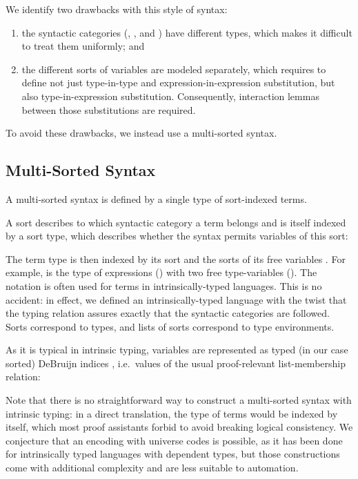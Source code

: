 \documentclass[sigplan,10pt, anonymous]{acmart}
\newenvironment{LibCode*}{%
  \begin{tcolorbox}[%
    colframe=white,%
    boxrule=0.0pt,%
    top=2.5pt,%
    left=2.5pt,%
    bottom=2.5pt,%
    right=2.5pt,%
    boxsep=0pt%
  ]\vspace{-0.2\baselineskip}%
}{%
  \vspace{-1\baselineskip}%
  \end{tcolorbox}%
}
\newcommand*\LibCode[1]{\begin{LibCode*}{#1}\end{LibCode*}}
\newcommand*\AppCode[1]{{#1}}
\newcommand*\ACode[1]{\AgdaFontStyle{\textcolor{mygray}{#1}}}
\newcommand*\ACon[1]{\AgdaInductiveConstructor{#1}}
\begin{document}
  We identify two drawbacks with this style of syntax:
  \begin{enumerate}
  \item
    the syntactic categories (\ACode{\ACon{Kind}},
    \ACode{\ACon{Type}}, and \ACode{\ACon{Expr}})
    have different types, which makes it difficult to treat them uniformly; and
  \item the different sorts of variables are modeled separately, which requires to define not just
    type-in-type and expression-in-expression substitution, but also type-in-expression substitution.
    Consequently, interaction lemmas between those substitutions are required.
  \end{enumerate}
  To avoid these drawbacks, we instead use a multi-sorted syntax.

  \subsection{Multi-Sorted Syntax}
  \label{sec:syntax:multi}
  A multi-sorted syntax is defined by a single type of sort-indexed terms.

  A sort describes to which syntactic category a term belongs and is
  itself indexed by a sort type, which describes whether the syntax
  permits variables of this sort:
  \LibCode\KSortTy
  \AppCode\FSort
  
  The term type \ACode{S \ACon{⊢} s} is then indexed by its sort
  \ACode{s} and the sorts of its free variables \ACode{S}.
  For example, \ACode{\ACon{[𝕥, 𝕥] ⊢ 𝕖}} is the type of expressions
  (\ACode{\ACon{𝕖}}) with two free type-variables (\ACode{\ACon{𝕥}}).
  \AppCode\FSyntax
  The notation \ACode{\ACon{\_⊢\_}} is often used for terms in
  intrinsically-typed languages. This is no accident: in effect, we
  defined an intrinsically-typed language with the twist that the
  typing relation assures exactly that the syntactic categories are followed.
  Sorts \ACode{s} correspond to types, and lists of sorts \ACode{S}
  correspond to type environments.

  As it is typical in intrinsic typing, variables are represented as
  typed (in our case sorted) DeBruijn indices \ACode{S \ACon{∋} s}, i.e.\
  values of the usual proof-relevant list-membership relation:
  \LibCode\KVariables

  Note that there is no straightforward way to construct a
  multi-sorted syntax with intrinsic typing: in a direct translation,
  the type of terms \ACode{\ACon{\_⊢\_}} would be indexed by itself, which
  most proof assistants forbid to avoid breaking logical consistency.
  We conjecture that an encoding with universe codes is possible, as
  it has been done for intrinsically typed languages with dependent
  types\cite{TODO}, but those constructions come with additional
  complexity and are less suitable to automation.
\end{document}
